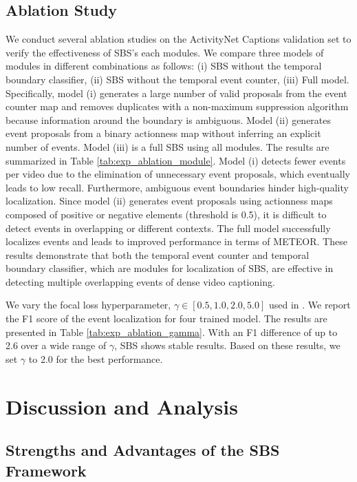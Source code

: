 \subsection{Ablation Study}
\label{subsec:exp_ablation}

We conduct several ablation studies on the ActivityNet Captions validation set to verify the effectiveness of SBS's each modules.
We compare three models of modules in different combinations as follows: (i) SBS without the temporal boundary classifier, (ii) SBS without the temporal event counter, (iii) Full model.
Specifically, model (i) generates a large number of valid proposals from the event counter map and removes duplicates with a non-maximum suppression algorithm because information around the boundary is ambiguous.
Model (ii) generates event proposals from a binary actionness map without inferring an explicit number of events.
Model (iii) is a full SBS using all modules.
The results are summarized in Table \ref{tab:exp_ablation_module}.
Model (i) detects fewer events per video due to the elimination of unnecessary event proposals, which eventually leads to low recall.
Furthermore, ambiguous event boundaries hinder high-quality localization.
Since model (ii) generates event proposals using actionness maps composed of positive or negative elements (threshold is 0.5), it is difficult to detect events in overlapping or different contexts.
The full model successfully localizes events and leads to improved performance in terms of METEOR.
These results demonstrate that both the temporal event counter and temporal boundary classifier, which are modules for localization of SBS, are effective in detecting multiple overlapping events of dense video captioning.

We vary the focal loss hyperparameter, $\gamma \in \left[0.5, 1.0, 2.0, 5.0\right]$ used in \cite{lin2017focal}.
We report the F1 score of the event localization for four trained model.
The results are presented in Table \ref{tab:exp_ablation_gamma}.
With an F1 difference of up to 2.6 over a wide range of $\gamma$, SBS shows stable results.
Based on these results, we set $\gamma$ to 2.0 for the best performance.


\section{Discussion and Analysis}
\label{sec:discussion}

\subsection{Strengths and Advantages of the SBS Framework}

